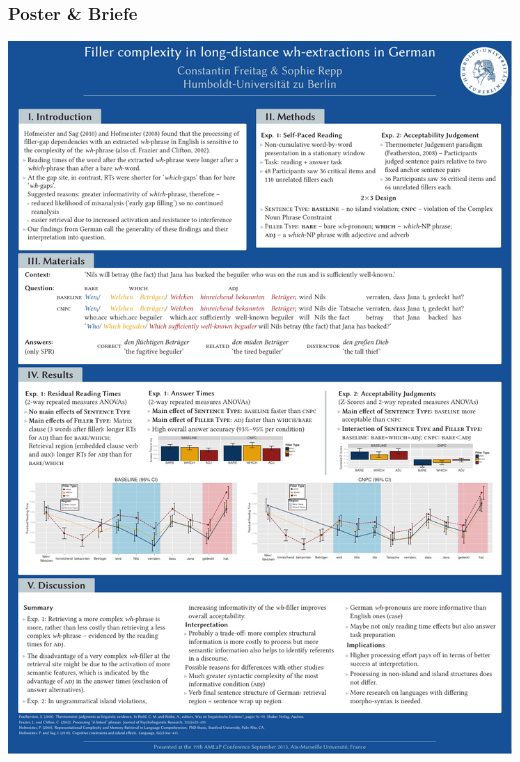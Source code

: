 \begin{frame}
\frametitle{Poster \& Briefe}


\begin{minipage}[b]{0.49\textwidth}
\centering
\includegraphics[width=0.80\linewidth]{../../texfiles-beamer/tex-material/WissArb-latex/Freitag_Repp_AMLaP_2013_A4.pdf}
\end{minipage}  
%  
\begin{minipage}[b]{0.49\textwidth}
\centering

\end{minipage}
\end{frame}
